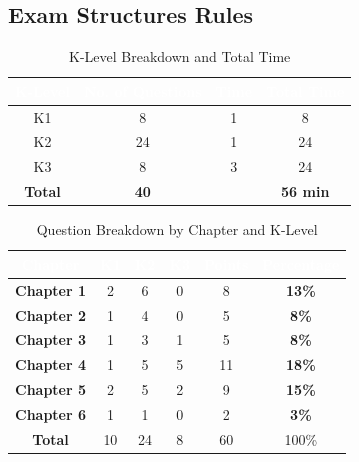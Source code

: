 \documentclass{article}
\begin{document}
\begin{multicols}{3}
{\section*{Exam Structures Rules}
\vspace{-10pt}
\begin{table}[H]
\renewcommand{\arraystretch}{1.8}
\centering
\begin{tabular}{|c|c|c|c|}
\hline
\rowcolor{black} \textcolor{white}{\textbf{K-Level}} & 
\textcolor{white}{\textbf{No. of Questions}} & 
\textcolor{white}{\textbf{Time}} & 
\textcolor{white}{\textbf{Total Time}} \\ \hline
K1                              & 8                                              & 1                                    & 8                       \\ \hline
K2                              & 24                                             & 1                                    & 24                      \\ \hline
K3                              & 8                                              & 3                                    & 24                      \\ \hline
\hline
\textbf{Total}                 & \textbf{40}                                    &                               & \textbf{56 min}             \\ \hline
\end{tabular}
\vspace{-5pt}
\caption*{K-Level Breakdown and Total Time}
\end{table}

\vspace{-15pt}
\begin{table}[H] 
\renewcommand{\arraystretch}{1.8}
\centering
\begin{tabular}{|c|c|c|c|c|c|}
\hline
\cellcolor{black}\textcolor{white}{\textbf{Chapter}} & \cellcolor{black}\textcolor{white}{\textbf{K1}} & \cellcolor{black}\textcolor{white}{\textbf{K2}} & \cellcolor{black}\textcolor{white}{\textbf{K3}} & \cellcolor{black}\textcolor{white}{\textbf{Points}} & \cellcolor{black}\textcolor{white}{\textbf{Percentage}} \\ \hline
\textbf{Chapter 1} & 2 & 6 & 0 & 8 & \textbf{13\%} \\ \hline
\textbf{Chapter 2} & 1 & 4 & 0 & 5 & \textbf{8\%} \\ \hline
\textbf{Chapter 3} & 1 & 3 & 1 & 5 & \textbf{8\%} \\ \hline
\textbf{Chapter 4} & 1 & 5 & 5 & 11 & \textbf{18\%} \\ \hline
\textbf{Chapter 5} & 2 & 5 & 2 & 9 & \textbf{15\%} \\ \hline
\textbf{Chapter 6} & 1 & 1 & 0 & 2 & \textbf{3\%} \\ \hline \hline
\textbf{Total} & 10 & 24 & 8 & 60 & 100\% \\ \hline
\end{tabular}
\vspace{-5pt}
\caption*{Question Breakdown by Chapter and K-Level}
\end{table}
}


\end{multicols}
\end{document}
